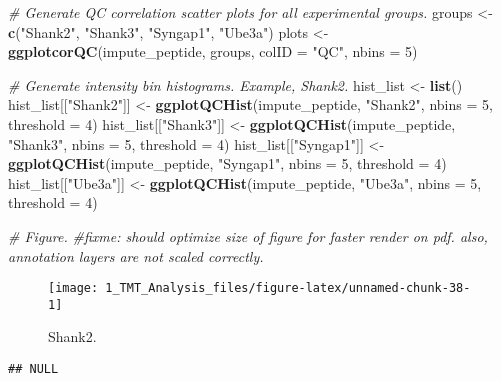 \documentclass[]{article}
\newenvironment{Shaded}{\begin{snugshade}}{\end{snugshade}}
\newcommand{\KeywordTok}[1]{\textcolor[rgb]{0.13,0.29,0.53}{\textbf{#1}}}
\newcommand{\DataTypeTok}[1]{\textcolor[rgb]{0.13,0.29,0.53}{#1}}
\newcommand{\DecValTok}[1]{\textcolor[rgb]{0.00,0.00,0.81}{#1}}
\newcommand{\StringTok}[1]{\textcolor[rgb]{0.31,0.60,0.02}{#1}}
\newcommand{\CommentTok}[1]{\textcolor[rgb]{0.56,0.35,0.01}{\textit{#1}}}
\newcommand{\NormalTok}[1]{#1}
\begin{document}
\begin{Shaded}
\begin{Highlighting}[]
\CommentTok{# Generate QC correlation scatter plots for all experimental groups.}
\NormalTok{groups <-}\StringTok{ }\KeywordTok{c}\NormalTok{(}\StringTok{"Shank2"}\NormalTok{, }\StringTok{"Shank3"}\NormalTok{, }\StringTok{"Syngap1"}\NormalTok{, }\StringTok{"Ube3a"}\NormalTok{)}
\NormalTok{plots <-}\StringTok{ }\KeywordTok{ggplotcorQC}\NormalTok{(impute_peptide, groups, }\DataTypeTok{colID =} \StringTok{"QC"}\NormalTok{, }\DataTypeTok{nbins =} \DecValTok{5}\NormalTok{)}

\CommentTok{# Generate intensity bin histograms. Example, Shank2.}
\NormalTok{hist_list <-}\StringTok{ }\KeywordTok{list}\NormalTok{()}
\NormalTok{hist_list[[}\StringTok{"Shank2"}\NormalTok{]] <-}\StringTok{ }\KeywordTok{ggplotQCHist}\NormalTok{(impute_peptide, }\StringTok{"Shank2"}\NormalTok{, }\DataTypeTok{nbins =} \DecValTok{5}\NormalTok{, }\DataTypeTok{threshold =} \DecValTok{4}\NormalTok{)}
\NormalTok{hist_list[[}\StringTok{"Shank3"}\NormalTok{]] <-}\StringTok{ }\KeywordTok{ggplotQCHist}\NormalTok{(impute_peptide, }\StringTok{"Shank3"}\NormalTok{, }\DataTypeTok{nbins =} \DecValTok{5}\NormalTok{, }\DataTypeTok{threshold =} \DecValTok{4}\NormalTok{)}
\NormalTok{hist_list[[}\StringTok{"Syngap1"}\NormalTok{]] <-}\StringTok{ }\KeywordTok{ggplotQCHist}\NormalTok{(impute_peptide, }\StringTok{"Syngap1"}\NormalTok{, }\DataTypeTok{nbins =} \DecValTok{5}\NormalTok{, }\DataTypeTok{threshold =} \DecValTok{4}\NormalTok{)}
\NormalTok{hist_list[[}\StringTok{"Ube3a"}\NormalTok{]] <-}\StringTok{ }\KeywordTok{ggplotQCHist}\NormalTok{(impute_peptide, }\StringTok{"Ube3a"}\NormalTok{, }\DataTypeTok{nbins =} \DecValTok{5}\NormalTok{, }\DataTypeTok{threshold =} \DecValTok{4}\NormalTok{)}

\CommentTok{# Figure.}
\CommentTok{#fixme: should optimize size of figure for faster render on pdf. also, annotation layers are not scaled correctly. }
\end{Highlighting}
\end{Shaded}

\begin{figure}

{\centering \texttt{[image: 1\_TMT\_Analysis\_files/figure-latex/unnamed-chunk-38-1]} 

}

\caption{Shank2.}\label{fig:unnamed-chunk-38}
\end{figure}

\begin{verbatim}
## NULL
\end{verbatim}
\end{document}
